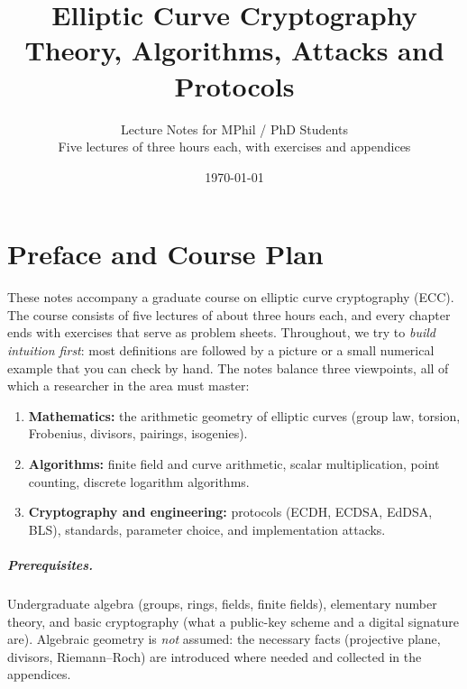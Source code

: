\documentclass[11pt,a4paper,oneside]{book}
\title{\Huge\bfseries Elliptic Curve Cryptography\\[0.4cm]
\Large Theory, Algorithms, Attacks and Protocols}
\author{\large Lecture Notes for MPhil / PhD Students\\[0.2cm] \normalsize Five lectures of three hours each, with exercises and appendices}
\date{\today}
\theoremstyle{plain}
\theoremstyle{definition}
\theoremstyle{remark}
\begin{document}
\maketitle
\frontmatter

\chapter*{Preface and Course Plan}

These notes accompany a graduate course on elliptic curve cryptography (ECC). The course consists of five lectures of about three hours each, and every
chapter ends with exercises that serve as problem sheets. Throughout, we try to \emph{build intuition first}: most definitions are followed by a picture or a small
numerical example that you can check by hand. The notes balance three viewpoints, all of which a researcher in the area must master:
\begin{enumerate}[label=(\roman*),nosep]
\item \textbf{Mathematics:} the arithmetic geometry of elliptic curves (group law, torsion, Frobenius, divisors, pairings, isogenies).
\item \textbf{Algorithms:} finite field and curve arithmetic, scalar multiplication, point counting, discrete logarithm algorithms.
\item \textbf{Cryptography and engineering:} protocols (ECDH, ECDSA, EdDSA, BLS), standards, parameter choice, and implementation attacks.
\end{enumerate}

\paragraph{Prerequisites.} Undergraduate algebra (groups, rings, fields, finite fields), elementary number theory,
and basic cryptography (what a public-key scheme and a digital signature are). Algebraic geometry is \emph{not} assumed:
the necessary facts (projective plane, divisors, Riemann--Roch) are introduced where needed and collected in the appendices.
\end{document}
